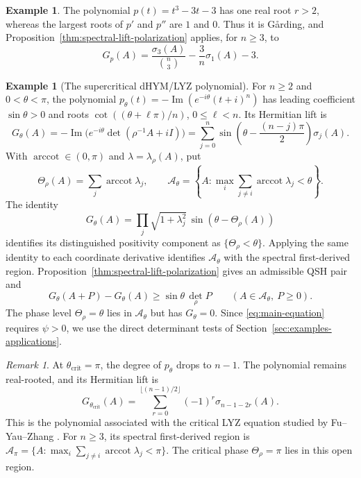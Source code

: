 \documentclass[oneside,english,letterpaper]{amsart}
\numberwithin{equation}{section}
\theoremstyle{plain}
\theoremstyle{definition}
\newtheorem{example}[thm]{Example}
\theoremstyle{remark}
\newtheorem{rem}[thm]{Remark}
\begin{document}
\begin{example}
The polynomial $p(t)=t^3-3t-3$ has one real root $r>2$, whereas
the largest roots of $p'$ and $p''$ are $1$ and $0$.
Thus it is G{\aa}rding, and Proposition~\ref{thm:spectral-lift-polarization}
applies, for $n\geq3$, to
\[
G_p(A)=\frac{\sigma_3(A)}{\binom n3}-\frac3n\sigma_1(A)-3.
\]
\end{example}


\begin{example}[The supercritical dHYM/LYZ polynomial]
\label{example:dHYM-Garding}
For $n\geq2$ and $0<\theta<\pi$, the polynomial
$p_\theta(t)=-\operatorname{Im}(e^{-i\theta}(t+i)^n)$ has leading
coefficient $\sin\theta>0$ and roots
$\cot((\theta+\ell\pi)/n)$, $0\leq\ell<n$. Its Hermitian lift is
\[
G_\theta(A)=-\operatorname{Im}\bigl(e^{-i\theta}
\det(\rho^{-1}A+iI)\bigr)
=\sum_{j=0}^n\sin\left(\theta-\frac{(n-j)\pi}{2}\right)\sigma_j(A).
\]
With $\operatorname{arccot}\in(0,\pi)$ and
$\lambda=\lambda_\rho(A)$, put
\[
\Theta_\rho(A)=\sum_j\operatorname{arccot}\lambda_j,
\qquad
\mathcal A_\theta=
\left\{A:\max_i\sum_{j\ne i}\operatorname{arccot}\lambda_j<\theta\right\}.
\]
The identity
\[
G_\theta(A)=\prod_j\sqrt{1+\lambda_j^2}\,
\sin(\theta-\Theta_\rho(A))
\]
identifies its distinguished positivity component as
$\{\Theta_\rho<\theta\}$. Applying the same identity to each
coordinate derivative identifies $\mathcal A_\theta$ with the
spectral first-derived region. Proposition~\ref{thm:spectral-lift-polarization}
gives an admissible QSH pair and
\[
G_\theta(A+P)-G_\theta(A)\geq\sin\theta\,\det_\rho P
\qquad(A\in\mathcal A_\theta,\ P\geq0).
\]
The phase level $\Theta_\rho=\theta$ lies in $\mathcal A_\theta$
but has $G_\theta=0$. Since \eqref{eq:main-equation} requires
$\psi>0$, we use the direct determinant tests of
Section~\ref{sec:examples-applications}.
\end{example}


\begin{rem}
\label{rem:dHYM-critical-phase}
At $\theta_{\mathrm{crit}}=\pi$, the degree of
$p_\theta$ drops to $n-1$. The polynomial remains real-rooted,
and its Hermitian lift is
$$
G_{\theta_{\mathrm{crit}}}(A)
=\sum_{r=0}^{\lfloor(n-1)/2\rfloor}
(-1)^r\sigma_{n-1-2r}(A).
$$
This is the polynomial associated with the critical LYZ equation
studied by Fu--Yau--Zhang \cite{fu2026criticallyzequationkahler}.
For $n\geq3$, its spectral first-derived region is
$\mathcal A_\pi=\{A:\max_i\sum_{j\ne i}\operatorname{arccot}\lambda_j<\pi\}$.
The critical phase $\Theta_\rho=\pi$ lies in this open region.

\end{rem}
\end{document}
